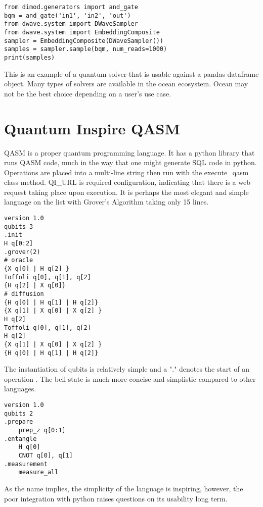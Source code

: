 \documentclass[conference]{IEEEtran}
\begin{document}
\begin{verbatim}
from dimod.generators import and_gate
bqm = and_gate('in1', 'in2', 'out')
from dwave.system import DWaveSampler
from dwave.system import EmbeddingComposite
sampler = EmbeddingComposite(DWaveSampler())
samples = sampler.sample(bqm, num_reads=1000)
print(samples)
\end{verbatim}

This is an example of a quantum solver that is usable against a pandas dataframe object. 
Many types of solvers are available in the ocean ecosystem.
Ocean may not be the best choice depending on a user's use case.

\section{Quantum Inspire QASM}
QASM is a proper quantum programming language. 
It has a python library that runs QASM code, much in the way that one might generate SQL code in python. 
Operations are placed into a multi-line string then run with the execute\_qasm class method. 
QI\_URL is required configuration, indicating that there is a web request taking place upon execution. 
It is perhaps the most elegant and simple language on the list with Grover's Algorithm taking only 15 lines.
\begin{verbatim}
version 1.0
qubits 3
.init
H q[0:2]
.grover(2)
# oracle
{X q[0] | H q[2] }
Toffoli q[0], q[1], q[2]
{H q[2] | X q[0]}
# diffusion
{H q[0] | H q[1] | H q[2]}
{X q[1] | X q[0] | X q[2] }
H q[2]
Toffoli q[0], q[1], q[2]
H q[2]
{X q[1] | X q[0] | X q[2] }
{H q[0] | H q[1] | H q[2]}
\end{verbatim}

The instantiation of qubits is relatively simple and a "." denotes the start of an operation \cite{b12}. 
The bell state is much more concise and simplistic compared to other languages. 
\begin{verbatim}
version 1.0
qubits 2
.prepare
    prep_z q[0:1]
.entangle
    H q[0]
    CNOT q[0], q[1]
.measurement
    measure_all
\end{verbatim}
As the name implies, the simplicity of the language is inspiring, however, the poor integration with python raises questions on its usability long term.
\end{document}
